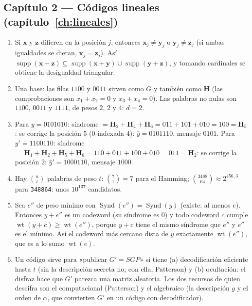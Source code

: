 \documentclass[11pt,a4paper,oneside]{report}
\newcommand{\wt}{\operatorname{wt}}
\newcommand{\supp}{\operatorname{supp}}
\newcommand{\Hmat}{\mathbf{H}}          %
\newcommand{\vx}{\mathbf{x}}
\newcommand{\vz}{\mathbf{z}}
\newcommand{\Syn}{\operatorname{Synd}}
\begin{document}
\subsection*{Capítulo 2 --- Códigos lineales
(capítulo~\ref{ch:lineales})}

\begin{enumerate}[leftmargin=1.9em,itemsep=4pt]
  \item Si $\vx$ y $\vz$ difieren en la posición $j$, entonces
        $\vx_j\neq\mathbf{y}_j$ o $\mathbf{y}_j\neq\vz_j$ (si ambas igualdades se
        dieran, $\vx_j=\vz_j$). Así
        $\supp(\vx+\vz)\subseteq\supp(\vx+\mathbf{y})\cup\supp(\mathbf{y}+\vz)$,
        y tomando cardinales se obtiene la desigualdad triangular.
  \item Una base: las filas $1100$ y $0011$ sirven como $G$ y también
        como $\Hmat$ (las comprobaciones son $x_1+x_2=0$ y
        $x_3+x_4=0$). Las palabras no nulas son $1100$, $0011$ y
        $1111$, de pesos $2$, $2$ y $4$: $d=2$.
  \item Para $y=0101010$: síndrome $=\Hmat_2+\Hmat_4+\Hmat_6
        =011+101+010=100=\Hmat_5$: se corrige la posición $5$
        ($0$-indexada $4$): $\hat y=0101110$, mensaje $0101$. Para
        $y'=1100110$: síndrome $=\Hmat_1+\Hmat_2+\Hmat_5+\Hmat_6
        =110+011+100+010=011=\Hmat_2$: se corrige la posición $2$:
        $\hat y'=1000110$, mensaje $1000$.
  \item Hay $\binom{n}{t}$ palabras de peso $t$: $\binom71=7$ para
        el Hamming; $\binom{3488}{64}\approx2^{456{,}3}$ para
        \texttt{348864}: unos $10^{137}$ candidatos.
  \item Sea $e''$ de peso mínimo con $\Syn(e'')=\Syn(y)$
        (existe: al menos $e$). Entonces $y+e''$ es un codeword (su
        síndrome es $0$) y todo codeword $c$ cumple
        $\wt(y+c)\ge\wt(e'')$, porque $y+c$ tiene el mismo síndrome
        que $e''$ y $e''$ es el mínimo. Así el codeword más cercano
        dista de $y$ exactamente $\wt(e'')$, que es a lo sumo
        $\wt(e)$.
  \item Un código sirve para «publicar $G'=SGP$» si tiene (a)
        decodificación eficiente hasta $t$ (sin la descripción
        secreta no; con ella, Patterson) y (b) ocultación: el disfraz
        hace que $G'$ parezca una matriz aleatoria. Los dos recursos
        de quien descifra son el computacional (Patterson) y el
        algebraico (la descripción $g$ y el orden de $\alpha$, que
        convierten $G'$ en un código con decodificador).
\end{enumerate}
\end{document}
